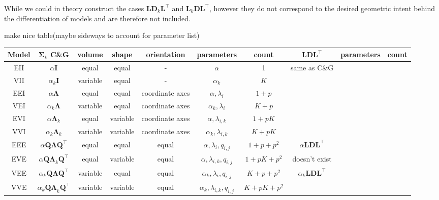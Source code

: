 While we could in theory construct the cases $\pmb{L}\pmb{D}_k\pmb{L}^\top$ and
$\pmb{L}_k \pmb{D} \pmb{L}^\top$, however they do not correspond to the desired
geometric intent behind the differentiation of models and are therefore not 
included.

make nice table(maybe sideways to account for parameter list)


\begin{table}[!htb]
    \centering
{}
{
    \begin{tabular}{| c | c c c c c c | c c c |}
        \hline
        Model & $\pmb{\Sigma}_k$ C\&G & volume & shape & orientation & parameters & count & $ \pmb{LDL}^\top $ & parameters & count \\
        \hline

        EII    & $ \alpha \pmb{I} $ & equal & equal & - & $ \alpha $ & 1 & same as C\&G & & \\
        VII    & $ \alpha_k \pmb{I} $         & variable & equal & - & $ \alpha_k $ & $ K $ & & & \\
        EEI    & $ \alpha \pmb{\Lambda} $     & equal & equal & coordinate axes & $ \alpha, \lambda_i $ & $ 1+p $ & & & \\
        VEI    & $ \alpha_k \pmb{\Lambda} $ & variable & equal & coordinate axes & $ \alpha_k, \lambda_{i}$ & $ K+p $ & & & \\
        EVI    & $ \alpha \pmb{\Lambda}_k $ &equal & variable & coordinate axes & $ \alpha, \lambda_{i,k} $ & $ 1+pK $ & & & \\
        VVI    & $ \alpha_k \pmb{\Lambda}_k $ & variable & variable & coordinate axes & $ \alpha_k, \lambda_{i,k} $ & $ K+pK $ & & & \\
        \hline
        EEE    & $ \alpha \pmb{Q \Lambda Q}^\top $ &equal & equal & equal & $ \alpha, \lambda_{i}, q_{i,j} $ & $ 1+p+p^2 $ & $ \alpha \pmb{LDL}^{\top} $ & & \\
        \hline
        EVE    & $ \alpha \pmb{Q \Lambda}_k \pmb{Q}^\top $ &equal & variable & equal & $ \alpha, \lambda_{i,k}, q_{i,j} $ & $ 1+pK+p^2 $ & doesn't exist & & \\
        \hline
        VEE    & $ \alpha_k \pmb{Q \Lambda Q}^\top $ & variable & equal & equal & $ \alpha_k, \lambda_{i}, q_{i,j} $ & $ K+p+p^2 $ & $ \alpha_k \pmb{LDL}^\top $ & & \\
        \hline
        VVE    & $ \alpha_k \pmb{Q \Lambda}_k \pmb{Q}^\top $ &variable & variable & equal & $ \alpha_k, \lambda_{i,k}, q_{i,j} $ & $ K+pK+p^2 $ & & & \\

\end{tabular}}
\end{table}
